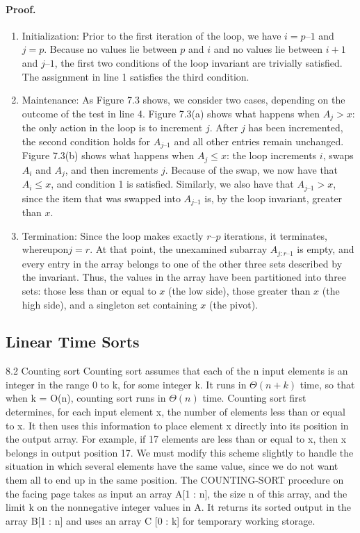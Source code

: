 \paragraph{Proof.}
\begin{enumerate}
  \item Initialization: Prior to the first iteration of the loop, we have $i = p – 1$ and $ j= p$. Because no values lie between $p$ and $i$ and no values lie between $i + 1$ and $j – 1$, the first two conditions of the loop invariant are trivially satisfied. The assignment in line 1 satisfies the third condition.
  \item Maintenance: As Figure 7.3 shows, we consider two cases, depending on the outcome of the test in line 4. Figure 7.3(a) shows what happens when $A_{j} > x$: the only action in the loop is to increment $j$. After $j$  has been incremented, the second condition holds for $A_{j – 1}$ and all other entries remain unchanged. Figure 7.3(b) shows what happens when $A_{j} \le x$: the loop increments $i$, swaps $A_{i}$ and $A_{j}$, and then increments $j$. Because of the swap, we now have that $A_{i} \le x$, and condition 1 is satisfied. Similarly, we also have that $A_{j – 1} > x$, since the item that was swapped into $A_{j – 1}$ is, by the loop invariant, greater than $x$.
  \item Termination: Since the loop makes exactly $r – p$ iterations, it terminates, whereupon$ j= r$. At that point, the unexamined subarray $A_{j : r – 1}$ is empty, and every entry in the array belongs to one of the other three sets described by the invariant. Thus, the values in the array have been partitioned into three sets: those less than or equal to $x$ (the low side), those greater than $x$ (the high side), and a singleton set containing $x$ (the pivot).


\end{enumerate}



\subsection{Linear Time Sorts}
8.2 Counting sort
Counting sort assumes that each of the n input elements is an integer in the range 0 to k, for some integer k. It runs in $\Theta \left(n + k\right)$ time, so that when k = O(n), counting sort runs in $\Theta\left(n\right)$ time.
Counting sort first determines, for each input element x, the number of elements less than or equal to x. It then uses this information to place element x directly into its position in the output array. For example, if 17 elements are less than or equal to x, then x belongs in output position 17. We must modify this scheme slightly to handle the situation in which several elements have the same value, since we do not want them all to end up in the same position.
The COUNTING-SORT procedure on the facing page takes as input an array A[1 : n], the size n of this array, and the limit k on the nonnegative integer values in A. It returns its sorted output in the array B[1 : n] and uses an array C [0 : k] for temporary working storage.


